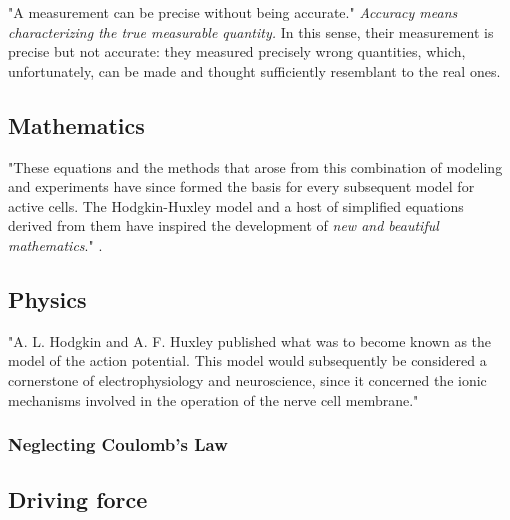 "A measurement can be precise without being accurate."\cite{JohnstonWuNeurophysiology:1995} \textit{Accuracy means characterizing 
the true measurable quantity.} In this sense, their measurement is precise but not accurate: they measured precisely wrong quantities, which, unfortunately, can be made and thought sufficiently resemblant to the real ones. 

\subsection{Mathematics\label{Physiology-HHMathematics}}
"These equations and the methods that arose from this combination of modeling and
experiments have since formed the basis for every subsequent model for active cells.
The Hodgkin-Huxley model and a host of simplified equations  derived from
them have inspired the development of \textit{new and beautiful mathematics}." \cite{MathNeuroscience:2010}.


\subsection{Physics\label{Physiology-HHPhysics}}

"A. L. Hodgkin and A. F. Huxley published what was to become known as the
model of the action potential. This model would subsequently be considered a cornerstone of
electrophysiology and neuroscience, since it concerned the ionic mechanisms involved in the
operation of the nerve cell membrane."~\cite{PhysicsForHodgkinHuxley:2024}




\subsubsection{Neglecting Coulomb's Law\label{Physiology-HHNeglectingCoulomb}}


\subsection{Driving force\label{sec:Physiology-HHDrivingForce}}



